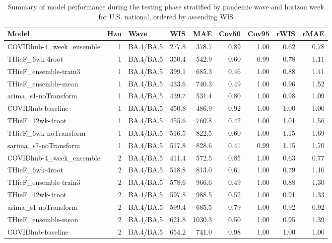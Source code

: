 \documentclass[thesis]{umassthesis}  %
\begin{document}
\begingroup\renewcommand{\arraystretch}{0.75} \setlength{\tabcolsep}{3pt}
\begin{longtable}{lrlrrrrrr}
\caption{Summary of model performance during the testing phase stratified by pandemic wave and horizon week for U.S. national, ordered by ascending WIS} \\ 
  \hline
Model & Hzn & Wave & WIS & MAE & Cov50 & Cov95 & rWIS & rMAE \\ 
  \hline
COVIDhub-4\_week\_ensemble & 1 & BA.4/BA.5 & 277.8 & 378.7 & 0.89 & 1.00 & 0.62 & 0.78 \\ 
  THieF\_6wk-4root & 1 & BA.4/BA.5 & 350.4 & 542.9 & 0.60 & 0.99 & 0.78 & 1.11 \\ 
  THieF\_ensemble-train3 & 1 & BA.4/BA.5 & 399.1 & 685.3 & 0.46 & 1.00 & 0.88 & 1.41 \\ 
  THieF\_ensemble-mean & 1 & BA.4/BA.5 & 433.6 & 740.3 & 0.49 & 1.00 & 0.96 & 1.52 \\ 
  arima\_s1-noTransform & 1 & BA.4/BA.5 & 439.7 & 531.4 & 0.80 & 1.00 & 0.98 & 1.09 \\ 
  COVIDhub-baseline & 1 & BA.4/BA.5 & 450.8 & 486.9 & 0.92 & 1.00 & 1.00 & 1.00 \\ 
  THieF\_12wk-4root & 1 & BA.4/BA.5 & 455.6 & 760.8 & 0.42 & 1.00 & 1.01 & 1.56 \\ 
  THieF\_6wk-noTransform & 1 & BA.4/BA.5 & 516.5 & 822.5 & 0.60 & 1.00 & 1.15 & 1.69 \\ 
  sarima\_s7-noTransform & 1 & BA.4/BA.5 & 517.8 & 828.6 & 0.41 & 0.99 & 1.15 & 1.70 \\ 
  COVIDhub-4\_week\_ensemble & 2 & BA.4/BA.5 & 411.4 & 572.5 & 0.85 & 1.00 & 0.63 & 0.77 \\ 
  THieF\_6wk-4root & 2 & BA.4/BA.5 & 518.8 & 813.0 & 0.61 & 1.00 & 0.79 & 1.10 \\ 
  THieF\_ensemble-train3 & 2 & BA.4/BA.5 & 578.6 & 966.6 & 0.49 & 1.00 & 0.88 & 1.30 \\ 
  THieF\_12wk-4root & 2 & BA.4/BA.5 & 597.8 & 988.5 & 0.52 & 1.00 & 0.91 & 1.33 \\ 
  arima\_s1-noTransform & 2 & BA.4/BA.5 & 599.4 & 685.5 & 0.79 & 1.00 & 0.92 & 0.92 \\ 
  THieF\_ensemble-mean & 2 & BA.4/BA.5 & 621.8 & 1030.3 & 0.50 & 1.00 & 0.95 & 1.39 \\ 
  COVIDhub-baseline & 2 & BA.4/BA.5 & 654.2 & 741.0 & 0.98 & 1.00 & 1.00 & 1.00 \\ 

\end{longtable}
\end{document}
